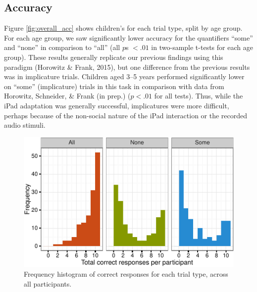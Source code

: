 \documentclass[10pt, letterpaper]{article}
\newenvironment{CodeChunk}{}{}
\begin{document}
\subsection{Accuracy}\label{accuracy}

Figure \ref{fig:overall_acc} shows children's for each trial type, split
by age group. For each age group, we saw significantly lower accuracy
for the quantifiers ``some'' and ``none'' in comparison to ``all'' (all
\(p\)s \(< .01\) in two-sample t-tests for each age group). These
results generally replicate our previous findings using this paradigm
(Horowitz \& Frank, 2015), but one difference from the previous results
was in implicature trials. Children aged 3--5 years performed
significantly lower on ``some'' (implicature) trials in this task in
comparison with data from Horowitz, Schneider, \& Frank (in prep.)
(\(p < .01\) for all tests). Thus, while the iPad adaptation was
generally successful, implicatures were more difficult, perhaps because
of the non-social nature of the iPad interaction or the recorded audio
stimuli.

\begin{CodeChunk}
\begin{figure}[t]
\includegraphics{figs/diptest-1} \caption[Frequency histogram of correct responses for each trial type, across all participants]{Frequency histogram of correct responses for each trial type, across all participants.}\label{fig:diptest}
\end{figure}
\end{CodeChunk}
\end{document}
